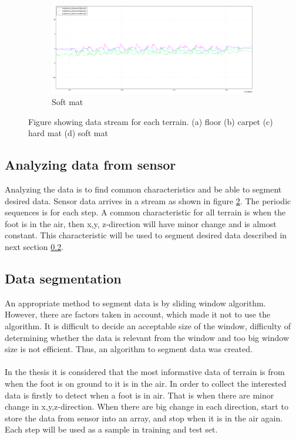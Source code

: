 \documentclass[USenglish]{ifimaster}  %
\begin{document}
	\begin{figure}[h] \ContinuedFloat
		\begin{subfigure}[b]{\textwidth}
			\includegraphics[width=\textwidth,height=\textheight,keepaspectratio]{Figures/mykmattegraf}
			\caption{Soft mat}
			\label{fig:mykmattegraf}
		\end{subfigure}
		\caption[]{Figure showing data stream for each terrain. (a) floor (b) carpet (c) hard mat (d) soft mat }
		\label{fig:gtmgraf}
	\end{figure}
	
	
	\FloatBarrier
	
	
	\subsection{Analyzing data from sensor}
	Analyzing the data is to find common characteristics and be able to segment desired data. Sensor data arrives in a stream as shown in figure \ref{fig:gtmgraf}. The periodic sequences is for each step. A common characteristic for all terrain is when the foot is in the air, then x,y, z-direction will have minor change and is almost constant. This characteristic will be used to segment desired data described in next section \ref{subseq:segmentation}. 
	
	\subsection{Data segmentation} \label{subseq:segmentation}
	An appropriate method to segment data is by sliding window algorithm. However, there are factors taken in account, which made it not to use the algorithm. It is difficult to decide an acceptable size of the window, difficulty of determining whether the data is relevant from the window and too big window size is not efficient. Thus, an algorithm to segment data was created. 
	\\
	\\
	In the thesis it is considered that the most informative data of terrain is from when the foot is on ground to it is in the air. In order to collect the interested data is firstly to detect when a foot is in air. That is when there are minor change in x,y,z-direction. When there are big change in each direction, start to store the data from sensor into an array, and stop when it is in the air again. Each step will be used as a sample in training and test set.
	
\end{document}
